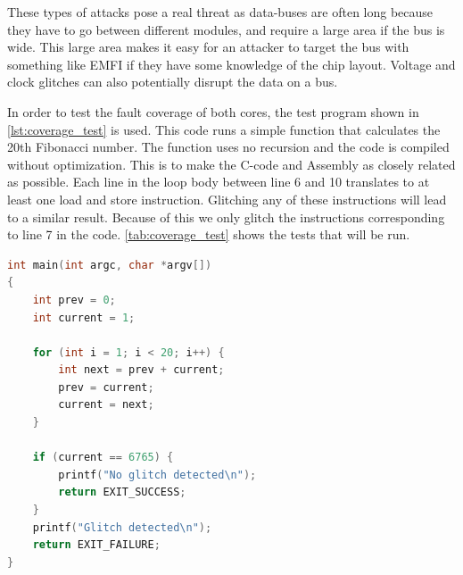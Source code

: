 These types of attacks pose a real threat as data-buses are often long because they have to go between different modules, and require a large area if the bus is wide. This large area makes it easy for an attacker to target the bus with something like EMFI if they have some knowledge of the chip layout. Voltage and clock glitches can also potentially disrupt the data on a bus. 

In order to test the fault coverage of both cores, the test program shown in \autoref{lst:coverage_test} is used. This code runs a simple function that calculates the 20th Fibonacci number. The function uses no recursion and the code is compiled without optimization. This is to make the C-code and Assembly as closely related as possible. Each line in the loop body between line 6 and 10 translates to at least one load and store instruction. Glitching any of these instructions will lead to a similar result. Because of this we only glitch the instructions corresponding to line 7 in the code. \autoref{tab:coverage_test} shows the tests that will be run. 


\begin{lstlisting}[caption={Test code for simulating glitch in address-bus.}, label=lst:coverage_test, language=C++]
int main(int argc, char *argv[])
{
    int prev = 0;
    int current = 1;

    for (int i = 1; i < 20; i++) {
        int next = prev + current;
        prev = current;
        current = next;
    }

    if (current == 6765) {
        printf("No glitch detected\n");
        return EXIT_SUCCESS;
    }
    printf("Glitch detected\n");
    return EXIT_FAILURE;
}
\end{lstlisting}

